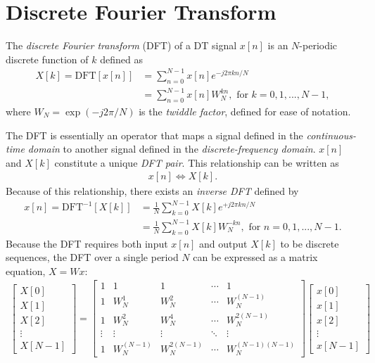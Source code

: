 \documentclass{report}
\begin{document}
\section{Discrete Fourier Transform}
\begin{tcolorbox}[width=\textwidth,colback={white}, sharp corners]
    The \emph{discrete Fourier transform} (DFT) of a DT signal $x[n]$ is an $N$-periodic discrete function of $k$ defined as 
    \begin{align}
        X[k] = \text{DFT}[x[n]] &= \sum_{n=0}^{N-1} x[n] e^{-j2\pi kn/N} \\
        &= \sum_{n=0}^{N-1} x[n] W^{kn}_N, \text{ for } k=0,1,...,N-1,
    \end{align}
    where $W_N=\exp(-j2\pi/N)$ is the \emph{twiddle factor}, defined for ease of notation.
\end{tcolorbox}
The DFT is essentially an operator that maps a signal defined in the \emph{continuous-time domain} to another signal defined 
in the \emph{discrete-frequency domain}. $x[n]$ and $X[k]$ constitute a unique \emph{DFT pair}. This relationship can be written as 
\begin{align}
    x[n] \iff X[k].
\end{align}
Because of this relationship, there exists an \emph{inverse DFT} defined by
\begin{align}
    x[n] = \text{DFT}^{-1}[X[k]] &= \frac{1}{N}\sum_{k=0}^{N-1} X[k] e^{+j2\pi kn/N} \\
    &= \frac{1}{N}\sum_{k=0}^{N-1} X[k] W^{-kn}_N, \text{ for } n=0,1,...,N-1.
\end{align}
Because the DFT requires both input $x[n]$ and output $X[k]$ to be discrete sequences, the DFT over a single period $N$ can be expressed as a matrix equation, $X=Wx$:
\begin{align}
    \begin{bmatrix}
        X[0] \\
        X[1] \\
        X[2] \\
        \vdots \\
        X[N-1]
    \end{bmatrix} = 
    \begin{bmatrix}
        1 & 1 & 1 & \cdots & 1 \\
        1 & W_N^1 & W_N^2 & \cdots & W_N^{(N-1)} \\
        1 & W_N^2 & W_N^4 & \cdots & W_N^{2(N-1)} \\
        \vdots & \vdots & \vdots & \ddots & \vdots \\
        1 & W_N^{(N-1)} & W_N^{2(N-1)} & \cdots & W_N^{(N-1)(N-1)}
    \end{bmatrix}
    \begin{bmatrix}
        x[0] \\
        x[1] \\
        x[2] \\
        \vdots \\
        x[N-1]
    \end{bmatrix}
\end{align}
\end{document}

